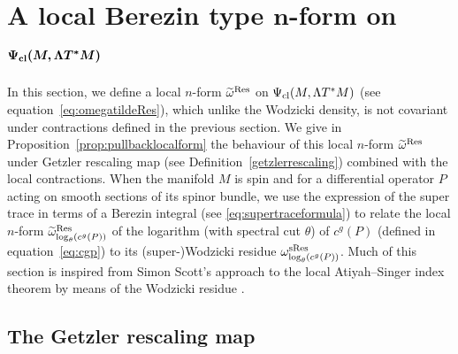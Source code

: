 \documentclass[10pt,a4paper]{amsart}
\numberwithin{equation}{section}
\theoremstyle{definition}
\begin{document}
\section[A local Berezin type n-form on Psi\_\{cl\} (M, Lambda T\^{}*M)]{A local Berezin type $\boldsymbol{n}$-form on $\boldsymbol{\Psi_{\rm cl} (M, \Lambda T^*M)}$}%

In this section, we define a local $n$-form $\widetilde \omega^{\rm Res}$ on $\Psi_{\rm cl} (M, \Lambda T^*M)$ (see equation~\eqref{eq:omegatildeRes}), which unlike the Wodzicki density, is not covariant under contractions defined in the previous section. We give in Proposition~\ref{prop:pullbacklocalform} the behaviour of this local $n$-form $\widetilde \omega^{\rm Res}$ under Getzler rescaling map
 (see Definition~\ref{getzlerrescaling}) combined with the local contractions. When the manifold $M$ is spin and for a differential operator $P$ acting on smooth sections of its spinor bundle, we use the expression of the super trace in terms of a Berezin integral (see \eqref{eq:supertraceformula}) to relate the local $n$-form $\widetilde \omega_{\log_\theta (c^g(P))}^{\rm Res}$ of the logarithm (with spectral cut $\theta$) of $c^g(P)$ (defined in equation~\eqref{eq:cgp}) to its (super-)Wodzicki residue $ \omega_{\log_\theta (c^g(P))}^{\rm sRes}$. Much of this section is inspired from Simon Scott's approach to the local Atiyah--Singer index theorem by means of the Wodzicki residue \cite[Section~3.5.3]{Sc}.

\subsection{The Getzler rescaling map}
\end{document}
